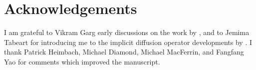 \documentclass[alpha-refs]{qjrms/wiley-article}
\begin{document}
\linenumbers











\appendix




\section*{Acknowledgements}

I am grateful to Vikram Garg early discussions on the
work by \citet{RSSB:RSSB777}, and to Jemima Tabeart for introducing me to the
implicit diffusion operator developments by \citet{mirouze_representation_2010}.
I thank Patrick Heimbach, Michael Diamond, Michael MacFerrin, and Fangfang Yao
for comments which improved the manuscript.


\end{document}
